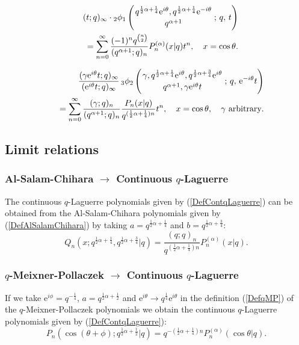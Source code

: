 \documentclass[envcountchap,graybox]{svmono}
\newcounter{rom}
\newcommand{\qhyp}[5]{\mbox{}_{#1}{\phi}_{#2}
\left(\genfrac{}{}{0pt}{}{#3}{#4}\,;\,q,\,#5\right)}
\newcommand{\e}{\textrm{e}}
\newcommand{\qhyp}[5]{\,\mbox{}_{#1}\phi_{#2}\!\left(
  \genfrac{}{}{0pt}{}{#3}{#4};#5\right)}
\begin{document}
{{\begin{eqnarray}
\label{GenContqLaguerre3}
& &(t;q)_{\infty}\cdot\qhyp{2}{1}{q^{\frac{1}{2}\alpha+\frac{1}{4}}\e^{i\theta},
q^{\frac{1}{2}\alpha+\frac{1}{4}}\e^{-i\theta}}{q^{\alpha+1}}{t}\nonumber\\
& &{}=\sum_{n=0}^{\infty}\frac{(-1)^nq^{\binom{n}{2}}}{(q^{\alpha+1};q)_n}
P_n^{(\alpha)}(x|q)t^n,\quad x=\cos\theta.
\end{eqnarray}

\begin{eqnarray}
\label{GenContqLaguerre4}
& &\frac{(\gamma\e^{i\theta}t;q)_{\infty}}{(\e^{i\theta}t;q)_{\infty}}\,
\qhyp{3}{2}{\gamma,q^{\frac{1}{2}\alpha+\frac{1}{4}}\e^{i\theta},q^{\frac{1}{2}\alpha+\frac{3}{4}}\e^{i\theta}}{q^{\alpha+1},\gamma\e^{i\theta}t}{\e^{-i\theta}t}\nonumber\\
& &{}=\sum_{n=0}^{\infty}\frac{(\gamma;q)_n}{(q^{\alpha+1};q)_n}\frac{P_n(x|q)}{q^{(\frac{1}{2}\alpha+\frac{1}{4})n}}t^n,
\quad x=\cos\theta,\quad\textrm{$\gamma$ arbitrary}.
\end{eqnarray}

\subsection*{Limit relations}

\subsubsection*{Al-Salam-Chihara $\rightarrow$ Continuous $q$-Laguerre}
The continuous $q$-Laguerre polynomials given by (\ref{DefContqLaguerre})
can be obtained from the Al-Salam-Chihara polynomials given by
(\ref{DefAlSalamChihara}) by taking $a=q^{\frac{1}{2}\alpha+\frac{1}{4}}$ and
$b=q^{\frac{1}{2}\alpha+\frac{3}{4}}$:
$$Q_n(x;q^{\frac{1}{2}\alpha+\frac{1}{4}},q^{\frac{1}{2}\alpha+\frac{3}{4}}|q)
=\frac{(q;q)_n}{q^{(\frac{1}{2}\alpha+\frac{1}{4})n}}P_n^{(\alpha)}(x|q).$$

\subsubsection*{$q$-Meixner-Pollaczek $\rightarrow$ Continuous $q$-Laguerre}
If we take $\e^{i\phi}=q^{-\frac{1}{4}}$, $a=q^{\frac{1}{2}\alpha+\frac{1}{2}}$
and $\e^{i\theta}\rightarrow q^{\frac{1}{4}}\e^{i\theta}$ in the definition
(\ref{DefqMP}) of the $q$-Meixner-Pollaczek polynomials we obtain the
continuous $q$-Laguerre polynomials given by (\ref{DefContqLaguerre}):
$$P_n(\cos(\theta+\phi);q^{\frac{1}{2}\alpha+\frac{1}{2}}|q)=
q^{-(\frac{1}{2}\alpha+\frac{1}{4})n}P_n^{(\alpha)}(\cos\theta|q).$$

}}
\end{document}
